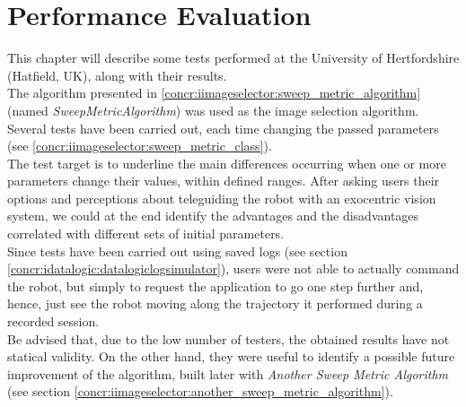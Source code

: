 \setcounter{figure}{0}
\setcounter{table}{0}
\setcounter{lstlisting}{0}

\chapter{Performance Evaluation}
\label{sec:performance_evaluation}
\minitoc

This chapter will describe some tests performed at the 
University of Hertfordshire (Hatfield, UK), along with 
their results. 
\\
The algorithm presented in \ref{concr:iimageselector:sweep_metric_algorithm}
(named \textit{SweepMetricAlgorithm}) was used as the image
selection algorithm. Several tests 
have been carried out, each time changing the passed parameters
(see \ref{concr:iimageselector:sweep_metric_class}).
\\
The test target is to underline the main differences 
occurring when one or more parameters change their values, 
within defined ranges. After asking users their options 
and perceptions about teleguiding the robot with an 
exocentric vision system, we could at the end identify 
the advantages and the disadvantages correlated with 
different sets of initial parameters.
\\
Since tests have been carried out using saved logs 
(see section \ref{concr:idatalogic:datalogiclogsimulator}),
users were not 
able to actually command the robot, but simply 
to request the application to go one step
further and, hence, just see the robot moving along 
the trajectory it performed during a recorded 
session.
\\
Be advised that, due to the low number of testers, 
the obtained results have not statical validity.
On the other hand, they were useful to identify 
a possible future improvement of the algorithm,
built later with \textit{Another Sweep Metric Algorithm} 
(see section \ref{concr:iimageselector:another_sweep_metric_algorithm}).

\clearpage

\clearpage

\clearpage

\clearpage

